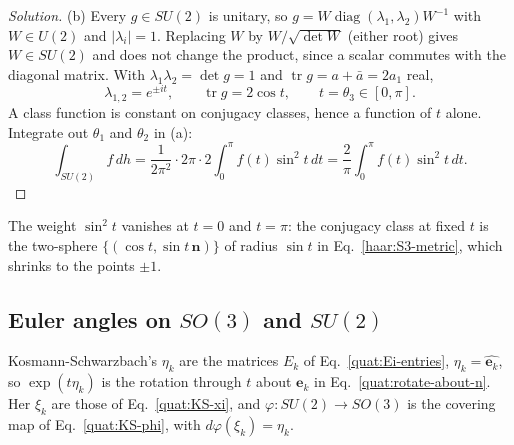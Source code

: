 \begin{proof}[Solution]
(b) Every $g\in SU(2)$ is unitary, so $g=W\operatorname{diag}(\lambda_1,
\lambda_2)W^{-1}$ with $W\in U(2)$ and $|\lambda_i|=1$. Replacing $W$ by
$W/\sqrt{\det W}$ (either root) gives $W\in SU(2)$ and does not change the
product, since a scalar commutes with the diagonal matrix. With
$\lambda_1\lambda_2=\det g=1$ and $\operatorname{tr}g=a+\bar a=2a_1$ real,
\begin{equation}\label{haar:SU2-classes}
 \lambda_{1,2}=e^{\pm it},\qquad \operatorname{tr}g=2\cos t,\qquad
 t=\theta_3\in[0,\pi].
\end{equation}
A class function is constant on conjugacy classes, hence a function of $t$
alone. Integrate out $\theta_1$ and $\theta_2$ in (a):
\begin{equation}\label{haar:weyl-SU2}
 \int_{SU(2)}f\,dh=\frac{1}{2\pi^2}\cdot2\pi\cdot2\int_0^\pi f(t)\sin^2t\,dt
 =\frac2\pi\int_0^\pi f(t)\sin^2t\,dt .
\end{equation}
\end{proof}
The weight $\sin^2t$ vanishes at $t=0$ and $t=\pi$: the conjugacy class at
fixed $t$ is the two-sphere $\{(\cos t,\sin t\,\mathbf n)\}$ of radius
$\sin t$ in Eq.~\eqref{haar:S3-metric}, which shrinks to the points $\pm1$.

\subsection{Euler angles on \texorpdfstring{$SO(3)$}{SO(3)} and \texorpdfstring{$SU(2)$}{SU(2)}}\label{haar:sec:euler}
Kosmann-Schwarzbach's $\eta_k$ are the matrices $E_k$ of
Eq.~\eqref{quat:Ei-entries}, $\eta_k=\widehat{\mathbf e_k}$, so
$\exp(t\eta_k)$ is the rotation through $t$ about $\mathbf e_k$ in
Eq.~\eqref{quat:rotate-about-n}. Her $\xi_k$ are those of
Eq.~\eqref{quat:KS-xi}, and $\varphi\colon SU(2)\to SO(3)$ is the covering
map of Eq.~\eqref{quat:KS-phi}, with $d\varphi(\xi_k)=\eta_k$.

